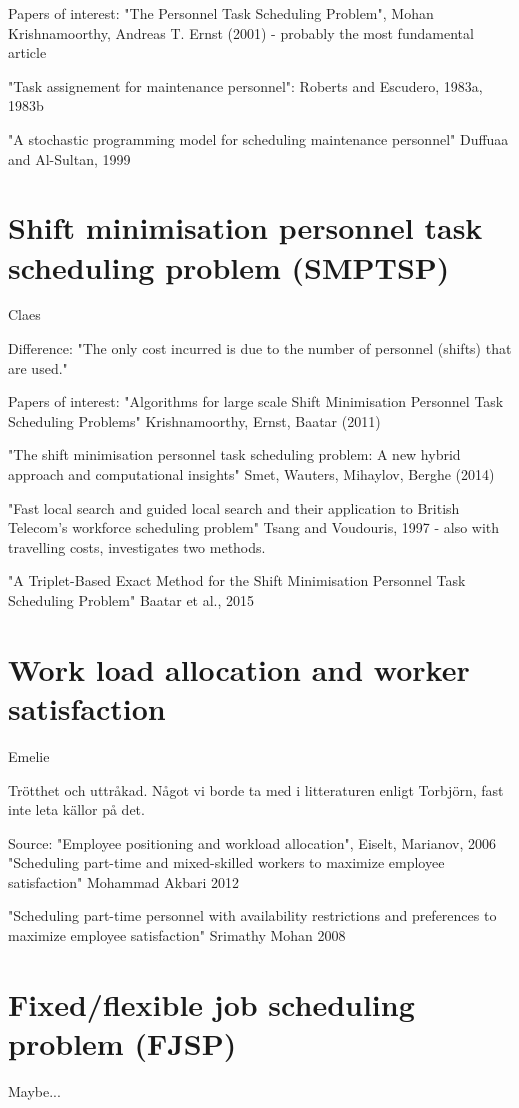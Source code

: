 Papers of interest:
"The Personnel Task Scheduling Problem", Mohan Krishnamoorthy, Andreas T. Ernst (2001) - probably the most fundamental article

"Task assignement for maintenance personnel": Roberts and Escudero, 1983a, 1983b

"A stochastic programming model for scheduling maintenance personnel" Duffuaa and Al-Sultan, 1999

\section{Shift minimisation personnel task scheduling problem (SMPTSP)}\label{SMTSP}
Claes

Difference: "The only cost incurred is due to the number of personnel (shifts) that are used."

Papers of interest:
"Algorithms for large scale Shift Minimisation Personnel Task Scheduling Problems" Krishnamoorthy, Ernst, Baatar (2011)

"The shift minimisation personnel task scheduling problem: A new hybrid approach and computational insights" Smet, Wauters, Mihaylov, Berghe (2014)

"Fast local search and guided local search and their application to British Telecom's workforce scheduling problem" Tsang and Voudouris, 1997 - also with travelling costs, investigates two methods.

"A Triplet-Based Exact Method for the Shift Minimisation Personnel Task Scheduling Problem" Baatar et al., 2015

\section{Work load allocation and worker satisfaction} \label{WLA}
Emelie

Trötthet och uttråkad. Något vi borde ta med i litteraturen enligt Torbjörn, fast inte leta källor på det.

Source: "Employee positioning and workload allocation", Eiselt, Marianov, 2006
"Scheduling part-time and mixed-skilled workers to maximize employee satisfaction" Mohammad Akbari 2012

"Scheduling part-time personnel with availability restrictions and preferences to maximize employee satisfaction" Srimathy Mohan 2008

\section{Fixed/flexible job scheduling problem (FJSP)}\label{FJSP}
Maybe...

